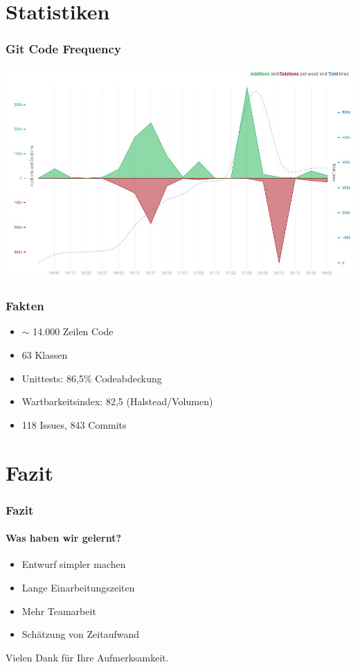 \documentclass[t]{beamer}
\begin{document}
\section{Statistiken}
\begin{frame}
	\frametitle{Git Code Frequency}
	\includegraphics[scale=.33]{img/GitCodeFrequency.jpg}\\
\end{frame}
\begin{frame}[c]
	\frametitle{Fakten}
	\begin{itemize}
	\item <+-> \begin{math}\sim\end{math} 14.000 Zeilen Code %
	\item <+-> 63 Klassen
	\item <+-> Unittests: 86,5\% Codeabdeckung
	\item <+-> Wartbarkeitsindex: 82,5 (Halstead/Volumen)
	\item <+-> 118 Issues, 843 Commits 
	\end{itemize}
\end{frame}


\section{Fazit}
\begin{frame}[c]
	\frametitle{Fazit}
	\framesubtitle{Was haben wir gelernt?}
	\begin{itemize}
	\item <+-> Entwurf simpler machen
	\item <+-> Lange Einarbeitungszeiten
	\item <+-> Mehr Teamarbeit
	\item <+-> Schätzung von Zeitaufwand
	\end{itemize}
\end{frame}
\begin{frame}[c]
	\begin{center}
	Vielen Dank für Ihre Aufmerksamkeit.
	\end{center}
\end{frame}
\end{document}
